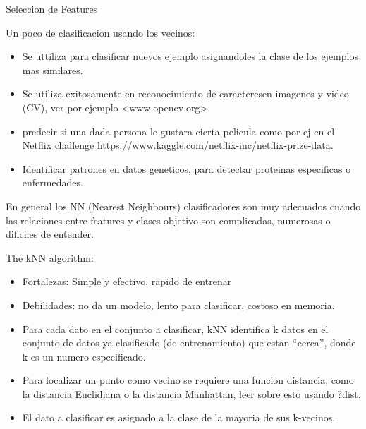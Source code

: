 \documentclass[ignorenonframetext,]{beamer}
\begin{document}
\begin{frame}

\begin{block}{Seleccion de Features}

\end{block}

\begin{block}{Un poco de clasificacion usando los vecinos:}

\begin{itemize}
\item
  Se uttiliza para clasificar nuevos ejemplo asignandoles la clase de
  los ejemplos mas similares.
\item
  Se utiliza exitosamente en reconocimiento de caracteresen imagenes y
  video (CV), ver por ejemplo \textless{}www.opencv.org\textgreater{}
\item
  predecir si una dada persona le gustara cierta pelicula como por ej en
  el Netflix challenge
  \url{https://www.kaggle.com/netflix-inc/netflix-prize-data}.
\item
  Identificar patrones en datos geneticos, para detectar proteinas
  especificas o enfermedades.
\end{itemize}

En general los NN (Nearest Neighbours) clasificadores son muy adecuados
cuando las relaciones entre features y clases objetivo son complicadas,
numerosas o dificiles de entender.

\end{block}

\end{frame}

\begin{frame}

\begin{block}{The kNN algorithm:}

\begin{itemize}
\item
  Fortalezas: Simple y efectivo, rapido de entrenar
\item
  Debilidades: no da un modelo, lento para clasificar, costoso en
  memoria.
\item
  Para cada dato en el conjunto a clasificar, kNN identifica k datos en
  el conjunto de datos ya clasificado (de entrenamiento) que estan
  ``cerca'', donde k es un numero especificado.
\item
  Para localizar un punto como vecino se requiere una funcion distancia,
  como la distancia Euclidiana o la distancia Manhattan, leer sobre esto
  usando ?dist.
\item
  El dato a clasificar es asignado a la clase de la mayoria de sus
  k-vecinos.
\end{itemize}

\end{block}

\end{frame}
\end{document}

